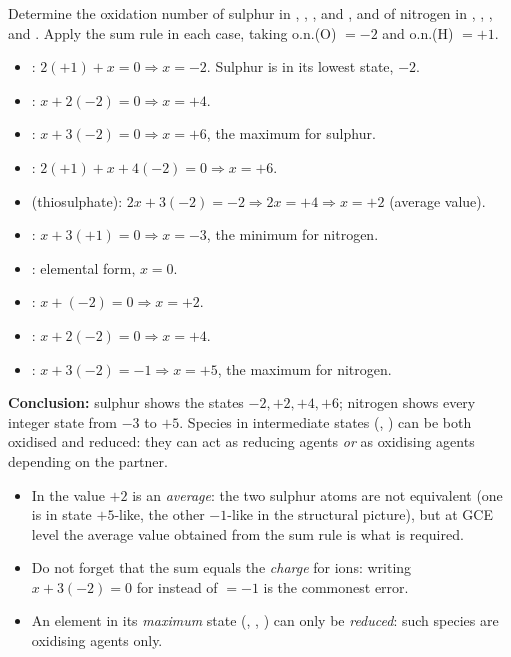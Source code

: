 \documentclass[11pt]{article}
\begin{document}
\begin{exoresolu}
Determine the oxidation number of sulphur in , , ,  and , and of nitrogen in , , ,  and .
\tcblower
Apply the sum rule in each case, taking o.n.(O) $= -2$ and o.n.(H) $= +1$.
\begin{itemize}
\item {}: $2(+1) + x = 0 \Rightarrow x = -2$. Sulphur is in its lowest state, $-2$.
\item {}: $x + 2(-2) = 0 \Rightarrow x = +4$.
\item {}: $x + 3(-2) = 0 \Rightarrow x = +6$, the maximum for sulphur.
\item {}: $2(+1) + x + 4(-2) = 0 \Rightarrow x = +6$.
\item {} (thiosulphate): $2x + 3(-2) = -2 \Rightarrow 2x = +4 \Rightarrow x = +2$ (average value).
\item {}: $x + 3(+1) = 0 \Rightarrow x = -3$, the minimum for nitrogen.
\item {}: elemental form, $x = 0$.
\item {}: $x + (-2) = 0 \Rightarrow x = +2$.
\item {}: $x + 2(-2) = 0 \Rightarrow x = +4$.
\item {}: $x + 3(-2) = -1 \Rightarrow x = +5$, the maximum for nitrogen.
\end{itemize}
\textbf{Conclusion:} sulphur shows the states $-2, +2, +4, +6$; nitrogen shows every integer state from $-3$ to $+5$. Species in intermediate states (, ) can be both oxidised and reduced: they can act as reducing agents \emph{or} as oxidising agents depending on the partner.
\end{exoresolu}

\begin{attention}
\begin{itemize}
\item In  the value $+2$ is an \emph{average}: the two sulphur atoms are not equivalent (one is in state $+5$-like, the other $-1$-like in the structural picture), but at GCE level the average value obtained from the sum rule is what is required.
\item Do not forget that the sum equals the \emph{charge} for ions: writing $x + 3(-2) = 0$ for  instead of $= -1$ is the commonest error.
\item An element in its \emph{maximum} state (, , ) can only be \emph{reduced}: such species are oxidising agents only.
\end{itemize}
\end{attention}
\end{document}
